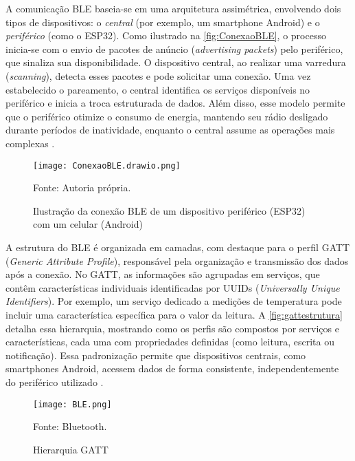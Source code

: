 A comunicação BLE baseia-se em uma arquitetura assimétrica, envolvendo dois tipos de dispositivos: o \textit{central} (por exemplo, um smartphone Android) e o \textit{periférico} (como o ESP32). Como ilustrado na \autoref{fig:ConexaoBLE}, o processo inicia-se com o envio de pacotes de anúncio (\textit{advertising packets}) pelo periférico, que sinaliza sua disponibilidade. O dispositivo central, ao realizar uma varredura (\textit{scanning}), detecta esses pacotes e pode solicitar uma conexão. Uma vez estabelecido o pareamento, o central identifica os serviços disponíveis no periférico e inicia a troca estruturada de dados. Além disso, esse modelo permite que o periférico otimize o consumo de energia, mantendo seu rádio desligado durante períodos de inatividade, enquanto o central assume as operações mais complexas \cite{bluetoothLEprimer2024}.

\begin{figure}[ht]
    \centering
    \caption{Ilustração da conexão BLE de um dispositivo periférico (ESP32) com um celular (Android)}
    \label{fig:ConexaoBLE}
    \texttt{[image: ConexaoBLE.drawio.png]}

    {\centering\footnotesize Fonte: Autoria própria.\par}
\end{figure}

A estrutura do BLE é organizada em camadas, com destaque para o perfil GATT (\textit{Generic Attribute Profile}), responsável pela organização e transmissão dos dados após a conexão. No GATT, as informações são agrupadas em serviços, que contêm características individuais identificadas por UUIDs (\textit{Universally Unique Identifiers}). Por exemplo, um serviço dedicado a medições de temperatura pode incluir uma característica específica para o valor da leitura. A \autoref{fig:gattestrutura} detalha essa hierarquia, mostrando como os perfis são compostos por serviços e características, cada uma com propriedades definidas (como leitura, escrita ou notificação). Essa padronização permite que dispositivos centrais, como smartphones Android, acessem dados de forma consistente, independentemente do periférico utilizado \cite{bleGATT}.

\begin{figure}[ht]
    \centering
    \caption{Hierarquia GATT}
    \label{fig:gattestrutura}
    \texttt{[image: BLE.png]}

    {\centering\footnotesize Fonte: Bluetooth.\par}
\end{figure}